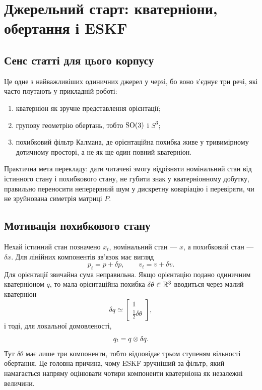 
\chapter{Джерельний старт: кватерніони, обертання і ESKF}


\section{Сенс статті для цього корпусу}

Це одне з найважливіших одиничних джерел у черзі, бо воно з'єднує три речі, які часто плутають у прикладній роботі:

\begin{enumerate}
\item кватерніон як зручне представлення орієнтації;
\item групову геометрію обертань, тобто $\mathrm{SO}(3)$ і $S^3$;
\item похибковий фільтр Калмана, де орієнтаційна похибка живе у тривимірному дотичному просторі, а не як ще один повний кватерніон.
\end{enumerate}

Практична мета перекладу: дати читачеві змогу відрізняти номінальний стан від істинного стану і похибкового стану, не губити знак у кватерніонному добутку, правильно переносити неперервний шум у дискретну коваріацію і перевіряти, чи не зруйнована симетрія матриці $P$.

\section{Мотивація похибкового стану}

Нехай істинний стан позначено $x_t$, номінальний стан --- $x$, а похибковий стан --- $\delta x$. Для лінійних компонентів зв'язок має вигляд
\[
p_t = p + \delta p,\qquad v_t = v + \delta v.
\]
Для орієнтації звичайна сума неправильна. Якщо орієнтацію подано одиничним кватерніоном $q$, то мала орієнтаційна похибка $\delta\theta\in\mathbb{R}^3$ вводиться через малий кватерніон
\[
\delta q \simeq
\begin{bmatrix}
1\\[1mm] \frac12\delta\theta
\end{bmatrix},
\]
і тоді, для локальної домовленості,
\[
q_t = q \otimes \delta q.
\]
Тут $\delta\theta$ має лише три компоненти, тобто відповідає трьом ступеням вільності обертання. Це головна причина, чому ESKF зручніший за фільтр, який намагається напряму оцінювати чотири компоненти кватерніона як незалежні величини.

